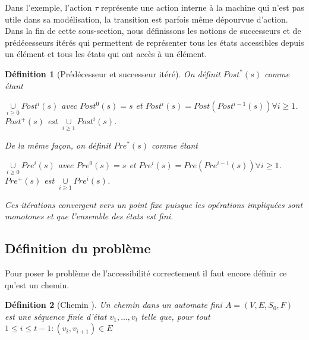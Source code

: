 \documentclass[11pt,a4paper,oneside]{book}
\theoremstyle{break}
\newtheorem{defin}{Définition}
\theoremstyle{breakplain}
\begin{document}
Dans l'exemple, l'action $\tau$ représente une action interne à la machine qui n'est pas utile dans sa modélisation, la transition est parfois même dépourvue d'action.\\

Dans la fin de cette sous-section, nous définissons les notions de successeurs et de prédécesseurs itérés qui permettent de représenter tous les états accessibles depuis un élément et tous les états qui ont accès à un élément.


\begin{defin}[Prédécesseur et successeur itéré\cite{baier2008principles}]
On définit $Post^*(s)$ comme étant 
\begin{center}$\underset{i \geq 0}{\cup} Post^i(s)$ avec $Post^0(s) = s$ et $Post^i(s) = Post(Post^{i-1}(s)) \forall i \geq 1$.\\
$Post^+(s)$ est $\underset{i \geq 1}{\cup} Post^i(s)$.
\end{center}
De la même façon, on définit $Pre^*(s)$ comme étant
\begin{center}
$\underset{i \geq 0}{\cup} Pre^i(s)$ avec $Pre^0(s) = s$ et $Pre^i(s) = Pre(Pre^{i-1}(s)) \forall i \geq 1$.\\
$Pre^+(s)$ est $\underset{i \geq 1}{\cup} Pre^i(s)$.
\end{center}

Ces itérations convergent vers un point fixe puisque les opérations impliquées sont monotones et que l'ensemble des états est fini.
\end{defin}

\subsection{Définition du problème}
Pour poser le problème de l'accessibilité correctement il faut encore définir ce qu'est un chemin.

\begin{defin}[Chemin \cite{geeraerts2013multiprocessor}]
Un chemin dans un automate fini $A = (V, E, S_0, F)$ est une séquence finie d'état $v_1, ..., v_t$ telle que, pour tout $1 \leq i \leq t-1 : (v_i, v_{i+1}) \in E$ 
\end{defin}
\end{document}
